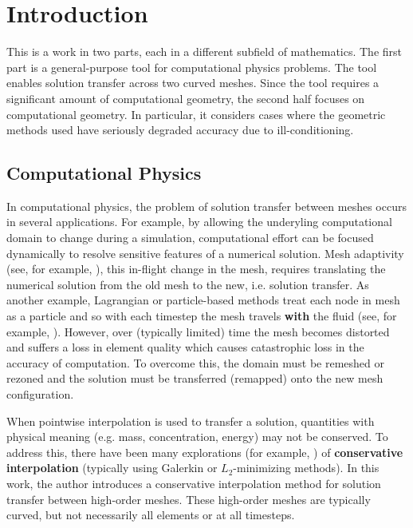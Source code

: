\chapter{Introduction}

This is a work in two parts, each in a different subfield of mathematics.
The first part is a general-purpose tool for computational physics problems.
The tool enables solution transfer across two curved meshes.
Since the tool requires a significant amount of computational geometry, the
second half focuses on computational geometry. In particular, it considers
cases where the geometric methods used have seriously degraded accuracy due to
ill-conditioning.

\section{Computational Physics}

In computational physics, the problem of solution transfer between meshes
occurs in several applications. For example, by allowing the underyling
computational domain to change during a simulation, computational
effort can be focused dynamically to resolve sensitive features
of a numerical solution. Mesh adaptivity (see, for example,
\cite{Babuska1978, Peraire1987, Pain2001}), this in-flight change in the mesh,
requires translating the numerical solution from the old mesh to the new,
i.e. solution transfer. As another example, Lagrangian or particle-based
methods treat each node in mesh as a particle and so with each timestep the
mesh travels \textbf{with} the fluid (see, for example, \cite{Hirt1974}).
However, over (typically limited) time the mesh
becomes distorted and suffers a loss in element quality which causes
catastrophic loss in the accuracy of computation. To overcome this, the
domain must be remeshed or rezoned and the solution must be
transferred (remapped) onto the new mesh configuration.

When pointwise interpolation is used to transfer a solution, quantities with
physical meaning (e.g. mass, concentration, energy) may not be conserved.
To address this, there have been many explorations (for example,
\cite{Jiao2004, Farrell2009, Farrell2011}) of
\textbf{conservative interpolation} (typically using Galerkin or
\(L_2\)-minimizing methods). In this work, the author introduces a
conservative interpolation method for solution transfer between high-order
meshes. These high-order meshes are typically curved, but not necessarily
all elements or at all timesteps.

